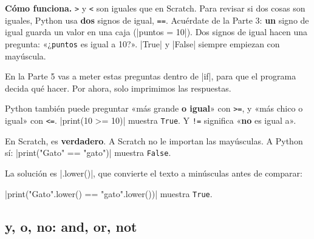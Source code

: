 \textbf{Cómo funciona.} \texttt{>} y \texttt{<} son iguales que en Scratch. Para revisar si dos cosas son iguales, Python usa \textbf{dos} signos de igual, \texttt{==}. Acuérdate de la Parte 3: \textbf{un} signo de igual guarda un valor en una caja (\py|puntos = 10|). Dos signos de igual hacen una pregunta: «¿\texttt{puntos} es igual a 10?». \py|True| y \py|False| siempre empiezan con mayúscula.

En la Parte 5 vas a meter estas preguntas dentro de \py|if|, para que el programa decida qué hacer. Por ahora, solo imprimimos las respuestas.

\begin{think}
Python también puede preguntar «más grande \textbf{o igual}» con \texttt{>=}, y «más chico o igual» con \texttt{<=}. \py|print(10 >= 10)| muestra \texttt{True}. Y \texttt{!=} significa «\textbf{no} es igual a».
\end{think}

\begin{watchout}
En Scratch,  es \textbf{verdadero}. A Scratch no le importan las mayúsculas. A Python sí: \py|print("Gato" == "gato")| muestra \texttt{False}.

La solución es \py|.lower()|, que convierte el texto a minúsculas antes de comparar:\par
\py|print("Gato".lower() == "gato".lower())| muestra \texttt{True}.
\end{watchout}

\subsection*{y, o, no: and, or, not}

